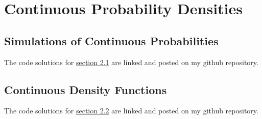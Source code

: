 \chapter{Continuous Probability Densities}
\section{Simulations of Continuous Probabilities}
The code solutions for  \href{https://github.com/krishramkumar06/probability/tree/main/grinstead_snell_probability_solutions/ch2/2-1}{section 2.1} are linked and posted on my github repository.

\section{Continuous Density Functions}

The code solutions for  \href{https://github.com/krishramkumar06/probability/tree/main/grinstead_snell_probability_solutions/ch2/2-2}{section 2.2} are linked and posted on my github repository.

